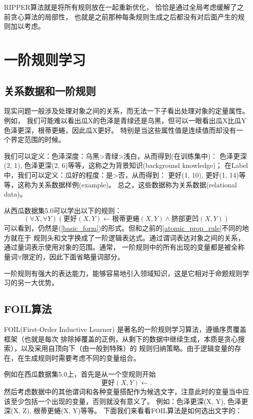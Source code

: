\documentclass[UTF8]{article}
\begin{document}
    RIPPER算法就是将所有规则放在一起重新优化，
    恰恰是通过全局考虑缓解了之前贪心算法的局部性，
    也就是之前那种每条规则生成之后都没有对后面产生的规则加以考虑。

\section{一阶规则学习}
\subsection{关系数据和一阶规则}
    现实问题一般涉及处理对象之间的关系，而无法一下子看出处理对象的定量属性。例如，
    我们可能难以看出瓜X的色泽是青绿还是乌黑，但可以一眼看出瓜X比瓜Y色泽更深，根蒂更蜷，因此瓜X更好。
    特别是当这些属性值是连续值而却没有一个界定范围的时候。

    我们可以定义：色泽深度：乌黑>青绿>浅白，从而得到(在训练集中)：
    色泽更深(2, 1), 色泽更深(2, 6)等等，这称之为背景知识(background knowledge)；
    在Label中，我们可以定义：瓜好的程度：是>否，从而得到：
    更好(1, 10), 更好(1, 14)等等，这称为关系数据样例(example)。
    总之，这些数据称为关系数据(relational data)。

    从西瓜数据集5.0可以学出以下的规则：
    \begin{equation}
        (\forall X, \forall Y)(\text{更好}(X, Y)\leftarrow \text{根蒂更蜷}(X, Y)\wedge \text{脐部更凹}(X, Y))
    \end{equation}
    可以看到，仍然是(\ref{basic_form})的形式。但和之前的\ref{atomic_prop_rule}不同的地方就在于
    规则头和文字换成了一阶逻辑表达式。通过谓词表达对象之间的关系，通过量词表示使用对象的范围。通常，
    一阶规则中的所有出现的变量都是被全称量词$\forall$限定的，因此下面省略量词部分。
    
    一阶规则有强大的表达能力，能够容易地引入领域知识，这是它相对于命题规则学习的另一大优势。
\subsection{FOIL算法}
    FOIL(First-Order Inductive Learner) 是著名的一阶规则学习算法，遵循序贯覆盖框架（也就是每次
    排除掉覆盖的正例，从剩下的数据中继续生成，本质是贪心搜索），以及采用自顶向下（由一般到特殊）的
    规则归纳策略。由于逻辑变量的存在，在生成规则时需要考虑不同的变量组合。
    
    例如在西瓜数据集5.0上，首先是从一个空规则开始
    \begin{equation}\label{empty_first_order_rule}
        \text{更好}(X, Y) \leftarrow .
    \end{equation}
    然后考虑数据中的其他谓词和各种变量搭配作为候选文字，注意此时的变量当中应该至少包括一个出现的变量，否则就没有意义了。
    例如：色泽更深(X, Y), 色泽更深(X, Z), 根蒂更蜷(X, Y)等等。
    下面我们来看看FOIL算法是如何选出文字的：
\end{document}
